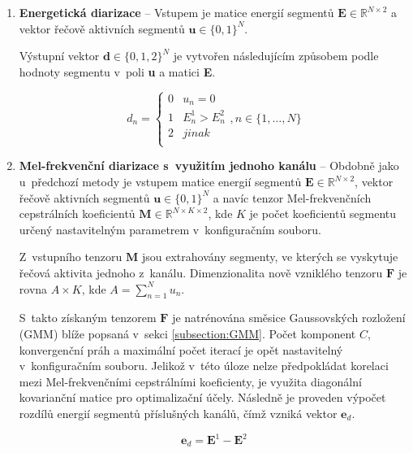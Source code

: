 \begin{enumerate}
    \item \textbf{Energetická diarizace} -- Vstupem je matice energií segmentů $\mathbf{E} \in \mathbb{R}^{N \times 2}$ a vektor řečově aktivních segmentů $\mathbf{u} \in \{0,1\}^{N}$.
    
    Výstupní vektor $\mathbf{d} \in \{0,1,2\}^{N}$ je vytvořen následujícím způsobem podle hodnoty segmentu v~poli \textbf{u} a matici \textbf{E}.
    
    \begin{equation}
    \label{eqn:DIAR_energy_active}
        d_{n} = \begin{cases}
            0               & u_{n} = 0\\
            1         & E_{n}^{1} > E_{n}^{2}\\
            2         & jinak\\
                        \end{cases}, n \in \{1,\dots, N\}
    \end{equation}
    
    \item \textbf{Mel-frekvenční diarizace s~využitím jednoho kanálu} -- Obdobně jako u~předchozí metody je vstupem matice energií segmentů $\mathbf{E} \in \mathbb{R}^{N \times 2}$, vektor řečově aktivních segmentů $\mathbf{u} \in \{0,1\}^{N}$ a navíc tenzor Mel-frekvenčních cepstrálních koeficientů $\mathbf{M} \in \mathbb{R}^{N \times K \times 2}$, kde $K$ je počet koeficientů segmentu určený nastavitelným parametrem v~konfiguračním souboru.
    
    Z~vstupního tenzoru $\mathbf{M}$ jsou extrahovány segmenty, ve kterých se vyskytuje řečová aktivita jednoho z~kanálu. Dimenzionalita nově vzniklého tenzoru $\mathbf{F}$ je rovna $A \times K$, kde $A = \sum_{n=1}^{N} u_{n}$. 
    
    S~takto získaným tenzorem $\mathbf{F}$ je natrénována směsice Gaussovských rozložení (GMM) blíže popsaná v~sekci \ref{subsection:GMM}. Počet komponent $C$, konvergenční práh a maximální počet iterací je opět nastavitelný v~konfiguračním souboru. Jelikož v~této úloze nelze předpokládat korelaci mezi Mel-frekvenčními cepstrálními koeficienty, je využita diagonální kovarianční matice pro optimalizační účely. Následně je proveden výpočet rozdílů energií segmentů příslušných kanálů, čímž vzniká vektor $\mathbf{e}_{d}$.
    
    \begin{equation}
    \label{eqn:Energy_diff}
       \mathbf{e}_{d} = \mathbf{E}^{1} - \mathbf{E}^{2}
    \end{equation}
    

\end{enumerate}
